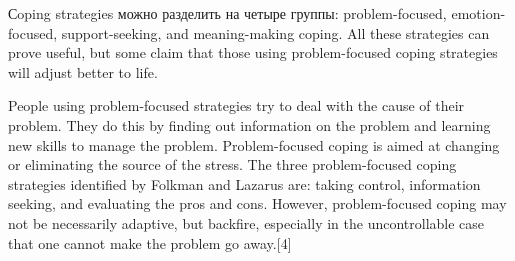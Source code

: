 \documentclass[11pt]{article}
\theoremstyle{remark}
\theoremstyle{definition}
\begin{document}
Сoping strategies можно разделить на четыре группы: problem-focused, emotion-focused, support-seeking, and meaning-making coping. All these strategies can prove useful, but some claim that those using problem-focused coping strategies will adjust better to life.







People using problem-focused strategies try to deal with the cause of their problem. They do this by finding out information on the problem and learning new skills to manage the problem. Problem-focused coping is aimed at changing or eliminating the source of the stress. The three problem-focused coping strategies identified by Folkman and Lazarus are: taking control, information seeking, and evaluating the pros and cons. However, problem-focused coping may not be necessarily adaptive, but backfire, especially in the uncontrollable case that one cannot make the problem go away.[4]
\end{document}
